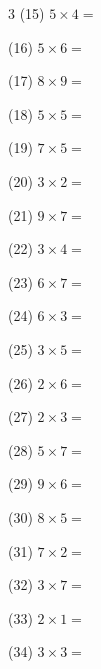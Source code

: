 \documentclass[a4paper, 11pt]{ltjsarticle}
\begin{document}
\begin{multicols*}{3}
\noindent (15) \quad $5 \times 4 =$
\vspace*{\fill}

\noindent (16) \quad $5 \times 6 =$
\vspace*{\fill}

\noindent (17) \quad $8 \times 9 =$
\vspace*{\fill}

\noindent (18) \quad $5 \times 5 =$
\vspace*{\fill}

\noindent (19) \quad $7 \times 5 =$
\vspace*{\fill}

\noindent (20) \quad $3 \times 2 =$
\vspace*{\fill}

\noindent (21) \quad $9 \times 7 =$
\vspace*{\fill}

\noindent (22) \quad $3 \times 4 =$
\vspace*{\fill}

\noindent (23) \quad $6 \times 7 =$
\vspace*{\fill}

\noindent (24) \quad $6 \times 3 =$
\vspace*{\fill}
\columnbreak

\noindent (25) \quad $3 \times 5 =$
\vspace*{\fill}

\noindent (26) \quad $2 \times 6 =$
\vspace*{\fill}

\noindent (27) \quad $2 \times 3 =$
\vspace*{\fill}

\noindent (28) \quad $5 \times 7 =$
\vspace*{\fill}

\noindent (29) \quad $9 \times 6 =$
\vspace*{\fill}

\noindent (30) \quad $8 \times 5 =$
\vspace*{\fill}

\noindent (31) \quad $7 \times 2 =$
\vspace*{\fill}

\noindent (32) \quad $3 \times 7 =$
\vspace*{\fill}

\noindent (33) \quad $2 \times 1 =$
\vspace*{\fill}

\noindent (34) \quad $3 \times 3 =$
\vspace*{\fill}


\end{multicols*}
\end{document}
